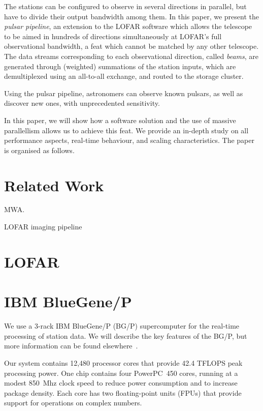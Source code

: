 \documentclass{llncs}
\begin{document}
The stations can be configured to observe in several directions in parallel, but have to divide their output bandwidth among them. In this paper, we present the \emph{pulsar pipeline}, an extension to the LOFAR software which allows the telescope to be aimed in hundreds of directions simultaneously at LOFAR's full observational bandwidth, a feat which cannot be matched by any other telescope. The data streams corresponding to each observational direction, called \emph{beams}, are generated through (weighted) summations of the station inputs, which are demultiplexed using an all-to-all exchange, and routed to the storage cluster.

Using the pulsar pipeline, astronomers can observe known pulsars, as well as discover new ones, with unprecedented sensitivity.  %

In this paper, we will show how a software solution and the use of massive parallellism allows us to achieve this feat. We provide an in-depth study on all performance aspects, real-time behaviour, and scaling characteristics. The paper is organised as follows.

\section{Related Work}

MWA.

LOFAR imaging pipeline \cite{Romein:10a}

\section{LOFAR}


\section{IBM BlueGene/P}

We use a 3-rack IBM BlueGene/P (BG/P) supercomputer for the real-time processing of station data. We will describe the key features of the BG/P, but more information can be found elsewhere~\cite{IBM:08}.

Our system contains 12,480 processor cores that provide 42.4 TFLOPS peak processing power. One chip contains four PowerPC~450 cores, running at a modest 850~Mhz clock speed to reduce power consumption and to increase package density. Each core has two floating-point units (FPUs) that provide support for operations on complex numbers.
\end{document}
